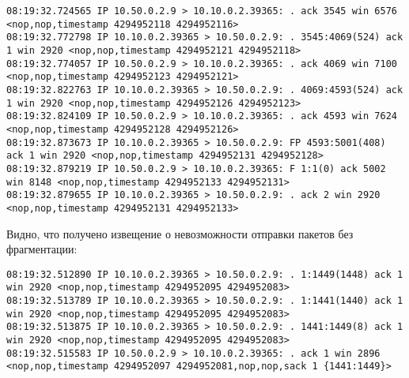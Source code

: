 \documentclass[a4paper,12pt]{article}
\begin{document}
\begin{Verbatim}
08:19:32.724565 IP 10.50.0.2.9 > 10.10.0.2.39365: . ack 3545 win 6576 <nop,nop,timestamp 4294952118 4294952116>
08:19:32.772798 IP 10.10.0.2.39365 > 10.50.0.2.9: . 3545:4069(524) ack 1 win 2920 <nop,nop,timestamp 4294952121 4294952118>
08:19:32.774057 IP 10.50.0.2.9 > 10.10.0.2.39365: . ack 4069 win 7100 <nop,nop,timestamp 4294952123 4294952121>
08:19:32.822763 IP 10.10.0.2.39365 > 10.50.0.2.9: . 4069:4593(524) ack 1 win 2920 <nop,nop,timestamp 4294952126 4294952123>
08:19:32.824109 IP 10.50.0.2.9 > 10.10.0.2.39365: . ack 4593 win 7624 <nop,nop,timestamp 4294952128 4294952126>
08:19:32.873673 IP 10.10.0.2.39365 > 10.50.0.2.9: FP 4593:5001(408) ack 1 win 2920 <nop,nop,timestamp 4294952131 4294952128>
08:19:32.879219 IP 10.50.0.2.9 > 10.10.0.2.39365: F 1:1(0) ack 5002 win 8148 <nop,nop,timestamp 4294952133 4294952131>
08:19:32.879655 IP 10.10.0.2.39365 > 10.50.0.2.9: . ack 2 win 2920 <nop,nop,timestamp 4294952131 4294952133>
\end{Verbatim}

Видно, что получено извещение о невозможности отправки пакетов без фрагментации:
\begin{Verbatim}
08:19:32.512890 IP 10.10.0.2.39365 > 10.50.0.2.9: . 1:1449(1448) ack 1 win 2920 <nop,nop,timestamp 4294952095 4294952083>
08:19:32.513789 IP 10.10.0.2.39365 > 10.50.0.2.9: . 1:1441(1440) ack 1 win 2920 <nop,nop,timestamp 4294952095 4294952083>
08:19:32.513875 IP 10.10.0.2.39365 > 10.50.0.2.9: . 1441:1449(8) ack 1 win 2920 <nop,nop,timestamp 4294952095 4294952083>
08:19:32.515583 IP 10.50.0.2.9 > 10.10.0.2.39365: . ack 1 win 2896 <nop,nop,timestamp 4294952097 4294952081,nop,nop,sack 1 {1441:1449}>
\end{Verbatim}
\end{document}
